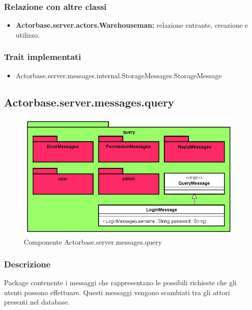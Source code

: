 \documentclass[a4paper]{article}
\begin{document}
			\subsubsection{Relazione con altre classi}
				\begin{itemize}
					\item \textbf{Actorbase.server.actors.Warehouseman:} relazione entrante, creazione e utilizzo.
				\end{itemize}
				
			\subsubsection{Trait implementati}
				\begin{itemize}
					\item Actorbase.server.messages.internal.StorageMessages.StorageMessage
				\end{itemize}				
				
				
				
				
				
				
				
				
				
				
				
				
				
		\subsection{Actorbase.server.messages.query}
		
			\begin{figure}[H]
				\centering
				\includegraphics[width=\textwidth]{ST/Server/queryLevel}
				\caption{Componente Actorbase.server.messages.query}
			\end{figure}
			
			\subsubsection{Descrizione}
				Package contenente i messaggi che rappresentano le possibili richieste che gli utenti possono effettuare. Questi messaggi vengono 
				scambiati tra gli attori presenti nel database.
				
\end{document}
